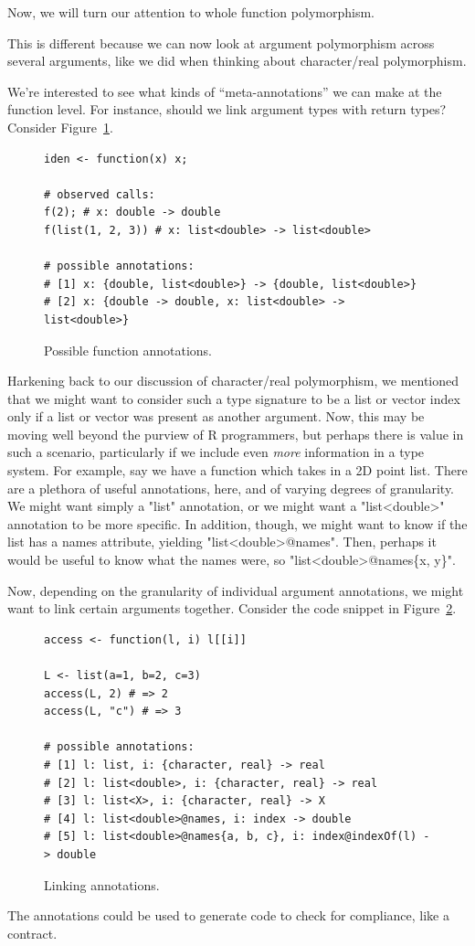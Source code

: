 \documentclass[acmsmall,10pt,review,anonymous]{acmart}\settopmatter{printfolios=true,printccs=false,printacmref=false}
\begin{document}
Now, we will turn our attention to whole function polymorphism.

This is different because we can now look at argument polymorphism across several arguments, like we did when thinking about character/real polymorphism.

We're interested to see what kinds of ``meta-annotations'' we can make at the function level.
For instance, should we link argument types with return types?
Consider Figure~\ref{fig:funanno}.
\begin{figure}[!hb]{\small\begin{lstlisting}[style=R]
iden <- function(x) x;

# observed calls:
f(2); # x: double -> double
f(list(1, 2, 3)) # x: list<double> -> list<double>

# possible annotations:
# [1] x: {double, list<double>} -> {double, list<double>}
# [2] x: {double -> double, x: list<double> -> list<double>}
\end{lstlisting}}\caption{Possible function annotations.}\label{fig:funanno}\end{figure}

Harkening back to our discussion of character/real polymorphism, we mentioned that we might want to consider such a type signature to be a list or vector index only if a list or vector was present as another argument.
Now, this may be moving well beyond the purview of R programmers, but perhaps there is value in such a scenario, particularly if we include even {\it more} information in a type system.
For example, say we have a function which takes in a 2D point list.
There are a plethora of useful annotations, here, and of varying degrees of granularity.
We might want simply a "list" annotation, or we might want a "list<double>" annotation to be more specific.
In addition, though, we might want to know if the list has a names attribute, yielding "list<double>@names".
Then, perhaps it would be useful to know what the names were, so "list<double>@names\{x, y\}".

Now, depending on the granularity of individual argument annotations, we might want to link certain arguments together.
Consider the code snippet in Figure~\ref{fig:indexof}.
\begin{figure}[!hb]{\small\begin{lstlisting}[style=R]
access <- function(l, i) l[[i]]

L <- list(a=1, b=2, c=3)
access(L, 2) # => 2
access(L, "c") # => 3

# possible annotations:
# [1] l: list, i: {character, real} -> real
# [2] l: list<double>, i: {character, real} -> real
# [3] l: list<X>, i: {character, real} -> X
# [4] l: list<double>@names, i: index -> double
# [5] l: list<double>@names{a, b, c}, i: index@indexOf(l) -> double
\end{lstlisting}}\caption{Linking annotations.}\label{fig:indexof}\end{figure}
The annotations could be used to generate code to check for compliance, like a contract.
\end{document}
